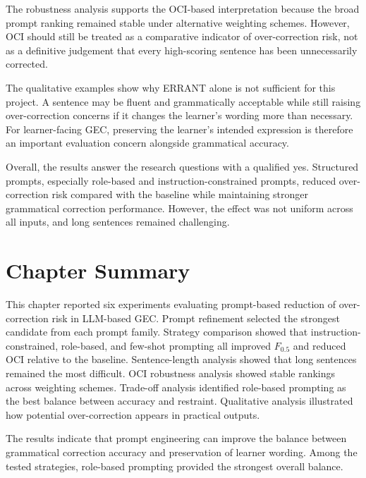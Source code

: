 The robustness analysis supports the OCI-based interpretation because the broad prompt ranking remained stable under alternative weighting schemes. However, OCI should still be treated as a comparative indicator of over-correction risk, not as a definitive judgement that every high-scoring sentence has been unnecessarily corrected.

The qualitative examples show why ERRANT alone is not sufficient for this project. A sentence may be fluent and grammatically acceptable while still raising over-correction concerns if it changes the learner's wording more than necessary. For learner-facing GEC, preserving the learner's intended expression is therefore an important evaluation concern alongside grammatical accuracy.

Overall, the results answer the research questions with a qualified yes. Structured prompts, especially role-based and instruction-constrained prompts, reduced over-correction risk compared with the baseline while maintaining stronger grammatical correction performance. However, the effect was not uniform across all inputs, and long sentences remained challenging.

\section{Chapter Summary}

This chapter reported six experiments evaluating prompt-based reduction of over-correction risk in LLM-based GEC. Prompt refinement selected the strongest candidate from each prompt family. Strategy comparison showed that instruction-constrained, role-based, and few-shot prompting all improved $F_{0.5}$ and reduced OCI relative to the baseline. Sentence-length analysis showed that long sentences remained the most difficult. OCI robustness analysis showed stable rankings across weighting schemes. Trade-off analysis identified role-based prompting as the best balance between accuracy and restraint. Qualitative analysis illustrated how potential over-correction appears in practical outputs.

The results indicate that prompt engineering can improve the balance between grammatical correction accuracy and preservation of learner wording. Among the tested strategies, role-based prompting provided the strongest overall balance.